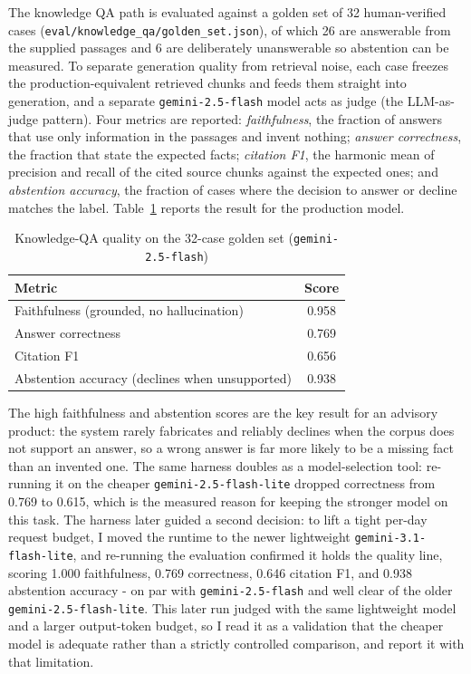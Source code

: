 \documentclass[../main.tex]{subfiles}
\begin{document}
The knowledge \gls{QA} path is evaluated against a golden set of 32 human-verified cases (\texttt{eval/knowledge\_qa/golden\_set.json}), of which 26 are answerable from the supplied passages and 6 are deliberately unanswerable so abstention can be measured.
To separate generation quality from retrieval noise, each case freezes the production-equivalent retrieved chunks and feeds them straight into generation, and a separate \texttt{gemini-2.5-flash} model acts as judge (the LLM-as-judge pattern).
Four metrics are reported: \textit{faithfulness}, the fraction of answers that use only information in the passages and invent nothing; \textit{answer correctness}, the fraction that state the expected facts; \textit{citation F1}, the harmonic mean of precision and recall of the cited source chunks against the expected ones; and \textit{abstention accuracy}, the fraction of cases where the decision to answer or decline matches the label.
Table~\ref{table:eval-qa} reports the result for the production model.

\begin{table}[H]
    \centering
    \caption{Knowledge-QA quality on the 32-case golden set (\texttt{gemini-2.5-flash})}
    \label{table:eval-qa}
    \begin{tabular}{|p{7.5cm}|c|}
        \hline
        \textbf{Metric} & \textbf{Score} \\
        \hline
        Faithfulness (grounded, no hallucination) & 0.958 \\
        \hline
        Answer correctness & 0.769 \\
        \hline
        Citation F1 & 0.656 \\
        \hline
        Abstention accuracy (declines when unsupported) & 0.938 \\
        \hline
    \end{tabular}
\end{table}

The high faithfulness and abstention scores are the key result for an advisory product: the system rarely fabricates and reliably declines when the corpus does not support an answer, so a wrong answer is far more likely to be a missing fact than an invented one.
The same harness doubles as a model-selection tool: re-running it on the cheaper \texttt{gemini-2.5-flash-lite} dropped correctness from 0.769 to 0.615, which is the measured reason for keeping the stronger model on this task.
The harness later guided a second decision: to lift a tight per-day request budget, I moved the runtime to the newer lightweight \texttt{gemini-3.1-flash-lite}, and re-running the evaluation confirmed it holds the quality line, scoring 1.000 faithfulness, 0.769 correctness, 0.646 citation F1, and 0.938 abstention accuracy - on par with \texttt{gemini-2.5-flash} and well clear of the older \texttt{gemini-2.5-flash-lite}.
This later run judged with the same lightweight model and a larger output-token budget, so I read it as a validation that the cheaper model is adequate rather than a strictly controlled comparison, and report it with that limitation.
\end{document}
